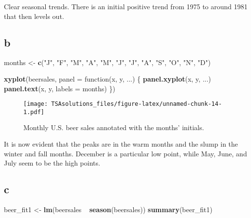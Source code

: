 \documentclass[]{book}
\newenvironment{Shaded}{\begin{snugshade}}{\end{snugshade}}
\newcommand{\KeywordTok}[1]{\textcolor[rgb]{0.13,0.29,0.53}{\textbf{{#1}}}}
\newcommand{\DataTypeTok}[1]{\textcolor[rgb]{0.13,0.29,0.53}{{#1}}}
\newcommand{\StringTok}[1]{\textcolor[rgb]{0.31,0.60,0.02}{{#1}}}
\newcommand{\NormalTok}[1]{{#1}}
\begin{document}
Clear seasonal trends. There is an initial positive trend from 1975 to
around 1981 that then levels out.

\subsection*{b}\label{b-23}

\begin{Shaded}
\begin{Highlighting}[]
\NormalTok{months <-}\StringTok{ }\KeywordTok{c}\NormalTok{(}\StringTok{"J"}\NormalTok{, }\StringTok{"F"}\NormalTok{, }\StringTok{"M"}\NormalTok{, }\StringTok{"A"}\NormalTok{, }\StringTok{"M"}\NormalTok{, }\StringTok{"J"}\NormalTok{, }\StringTok{"J"}\NormalTok{, }\StringTok{"A"}\NormalTok{, }\StringTok{"S"}\NormalTok{, }\StringTok{"O"}\NormalTok{, }\StringTok{"N"}\NormalTok{, }\StringTok{"D"}\NormalTok{)}

\KeywordTok{xyplot}\NormalTok{(beersales,}
       \DataTypeTok{panel =} \NormalTok{function(x, y, ...) \{}
         \KeywordTok{panel.xyplot}\NormalTok{(x, y, ...)}
         \KeywordTok{panel.text}\NormalTok{(x, y, }\DataTypeTok{labels =} \NormalTok{months)}
       \NormalTok{\})}
\end{Highlighting}
\end{Shaded}

\begin{figure}[htbp]
\centering
\texttt{[image: TSAsolutions\_files/figure-latex/unnamed-chunk-14-1.pdf]}
\caption{\label{fig:unnamed-chunk-14}Monthly U.S. beer sales annotated with
the months' initials.}
\end{figure}

It is now evident that the peaks are in the warm months and the slump in
the winter and fall months. December is a particular low point, while
May, June, and July seem to be the high points.

\subsection*{c}\label{c-12}

\begin{Shaded}
\begin{Highlighting}[]
\NormalTok{beer_fit1 <-}\StringTok{ }\KeywordTok{lm}\NormalTok{(beersales ~}\StringTok{ }\KeywordTok{season}\NormalTok{(beersales))}
\KeywordTok{summary}\NormalTok{(beer_fit1)}
\end{Highlighting}
\end{Shaded}
\end{document}
